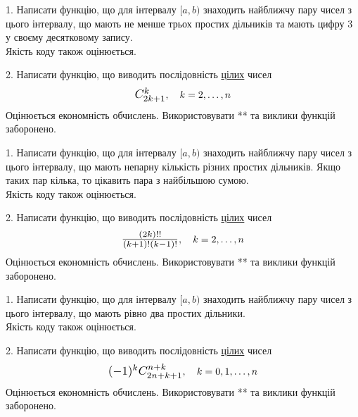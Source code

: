 \documentclass[12pt, ukrainian]{article}
\begin{document}



\begin {Large}
1. Написати функцію, що для інтервалу $[a, b)$ знаходить найближчу пару чисел з цього інтервалу, що мають не менше трьох простих дільників та мають цифру 3 у своєму десятковому запису.\\	Якість коду також оцінюється. 



\vspace{10mm}

\newpage

2. 
Написати функцію, що виводить послідовність \underline{цілих} чисел
$$\scalebox{1.2}{$C_{2k+1}^{k}$}, \quad k=2,\ldots,n$$
Оцінюється економність обчислень. Використовувати ** та виклики функцій заборонено.

\end {Large}\newpage




\begin {Large}
1. Написати функцію, що для інтервалу $[a, b)$ знаходить найближчу пару чисел з цього інтервалу, що мають непарну кількість різних простих дільників. Якщо таких пар кілька, то цікавить пара з найбільшою сумою.\\	Якість коду також оцінюється. 



\vspace{10mm}

\newpage

2. 
Написати функцію, що виводить послідовність \underline{цілих} чисел
$$\scalebox{1.2}{$\frac{(2k)!!}{(k+1)!(k-1)!}$}, \quad k=2,\ldots,n$$
Оцінюється економність обчислень. Використовувати ** та виклики функцій заборонено.

\end {Large}\newpage




\begin {Large}
1. Написати функцію, що для інтервалу $[a, b)$ знаходить найближчу пару чисел з цього інтервалу, що мають рівно два простих дільники.\\	Якість коду також оцінюється. 



\vspace{10mm}

\newpage

2. 
Написати функцію, що виводить послідовність \underline{цілих} чисел
$$\scalebox{1.2}{$(-1)^{k}C_{2n+k+1}^{n+k}$}, \quad k=0,1,\ldots,n$$
Оцінюється економність обчислень. Використовувати ** та виклики функцій заборонено.

\end {Large}\newpage
\end{document}
